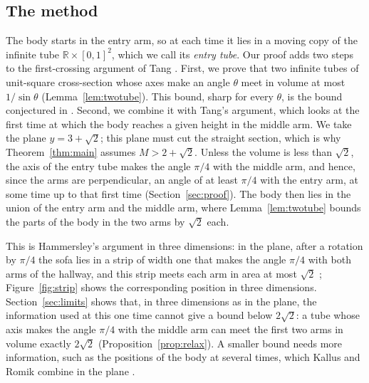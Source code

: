 \documentclass[11pt]{amsart}
\theoremstyle{definition}
\theoremstyle{remark}
\numberwithin{equation}{section}
\newcommand{\R}{\mathbb{R}}
\begin{document}
\subsection*{The method}
The body starts in the entry arm, so at each time it lies in a moving copy of the infinite tube $\R\times[0,1]^2$, which we call its \emph{entry tube}. Our proof adds two steps to the first-crossing argument of Tang \cite{Tan26a}. First, we prove that two infinite tubes of unit-square cross-section whose axes make an angle $\theta$ meet in volume at most $1/\sin\theta$ (Lemma~\ref{lem:twotube}). This bound, sharp for every $\theta$, is the bound conjectured in \cite[Remark~8.1]{Tan26a}. Second, we combine it with Tang's argument, which looks at the first time at which the body reaches a given height in the middle arm. We take the plane $y=3+\sqrt2$; this plane must cut the straight section, which is why Theorem~\ref{thm:main} assumes $M>2+\sqrt2$. Unless the volume is less than $\sqrt2$, the axis of the entry tube makes the angle $\pi/4$ with the middle arm, and hence, since the arms are perpendicular, an angle of at least $\pi/4$ with the entry arm, at some time up to that first time (Section~\ref{sec:proof}). The body then lies in the union of the entry arm and the middle arm, where Lemma~\ref{lem:twotube} bounds the parts of the body in the two arms by $\sqrt2$ each.

This is Hammersley's argument in three dimensions: in the plane, after a rotation by $\pi/4$ the sofa lies in a strip of width one that makes the angle $\pi/4$ with both arms of the hallway, and this strip meets each arm in area at most $\sqrt2$ \cite[Section~2]{KR18}; Figure~\ref{fig:strip} shows the corresponding position in three dimensions. Section~\ref{sec:limits} shows that, in three dimensions as in the plane, the information used at this one time cannot give a bound below $2\sqrt2$: a tube whose axis makes the angle $\pi/4$ with the middle arm can meet the first two arms in volume exactly $2\sqrt2$ (Proposition~\ref{prop:relax}). A smaller bound needs more information, such as the positions of the body at several times, which Kallus and Romik combine in the plane \cite{KR18}.
\end{document}
